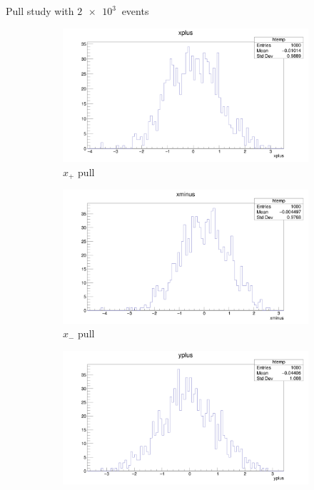 \documentclass{beamer}
\begin{document}
\begin{frame}{Pull study with $\SI{2e3}{}$ events}
  \begin{figure}
    \centering
    \vspace{-0.2cm}
    \begin{subfigure}{0.5\textwidth}
      \includegraphics[width = 1.0\textwidth]{AmplitudePulls/xplus1K1K.png}
      \caption{$x_+$ pull}
    \end{subfigure}%
    \begin{subfigure}{0.5\textwidth}
      \includegraphics[width = 1.0\textwidth]{AmplitudePulls/xminus1K1K.png}
      \caption{$x_-$ pull}
    \end{subfigure}
    \begin{subfigure}{0.5\textwidth}
      \includegraphics[width = 1.0\textwidth]{AmplitudePulls/yplus1K1K.png}

\end{subfigure}
\end{figure}
\end{frame}
\end{document}
